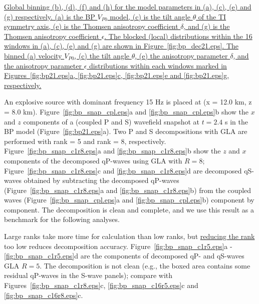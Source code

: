 \documentclass[manuscript,ulem,graphix,revised]{geophysics}
\begin{document}
 {
 \small{
 \uline{
Global binning (b), (d), (f) and (h) for the model parameters in (a), (c), (e) and (g) respectively.
 (a) is the BP $V_{P0}$ model, (c) is the tilt angle $\theta$ of the TI symmetry axis, (e) is the Thomsen anisotropy coefficient $\delta$, and (g) is the Thomsen anisotropy coefficient $\epsilon$. The blocked (local) distributions within the 16 windows in (a), (c), (e) and (g) are shown in Figure~\ref{fig:bp_dec21.eps}.
 }
}
}
 {
 \uline{
 The binned (a) velocity $V_{P0}$, (c) the tilt angle $\theta$, (e) the anisotropy parameter $\delta$, and the anisotropy parameter $\epsilon$ distributions within each windows marked in Figures~\ref{fig:bp21.eps}a, \ref{fig:bp21.eps}c, \ref{fig:bp21.eps}e and \ref{fig:bp21.eps}g, respectively.
}
}

An explosive source with dominant frequency 15 Hz is placed at (x = 12.0 km, z = 8.0 km). Figure~\ref{fig:bp_snap_cpl.eps}a and \ref{fig:bp_snap_cpl.eps}b show the $x$ and $z$ components of a (coupled P and S) wavefield snapshot at $t=2.4$ s in the BP model (Figure~\ref{fig:bp21.eps}a).
Two P and S decompositions with GLA are performed with rank = 5 and rank = 8, respectively.  
Figure~\ref{fig:bp_snap_c1r8.eps}a and \ref{fig:bp_snap_c1r8.eps}b show the  $z$ and $x$ components of the decomposed qP-waves using GLA with $R=8$; Figure~\ref{fig:bp_snap_c1r8.eps}c and \ref{fig:bp_snap_c1r8.eps}d are decomposed qS-waves obtained by subtracting the decomposed qP-waves (Figure~\ref{fig:bp_snap_c1r8.eps}a and \ref{fig:bp_snap_c1r8.eps}b) from the coupled waves (Figure~\ref{fig:bp_snap_cpl.eps}a and \ref{fig:bp_snap_cpl.eps}b) component by component. The decomposition is clean and complete, and we use this result as a benchmark for the following analyses. 

Large ranks take more time for calculation than low ranks, but \marginnote{[15]}\uline{reducing the rank} too low reduces decomposition accuracy. Figure~\ref{fig:bp_snap_c1r5.eps}a - \ref{fig:bp_snap_c1r5.eps}d are the components of decomposed qP- and qS-waves GLA $R=5$. The decomposition is not clean (e.g., the boxed area contains some residual qP-waves in the S-wave panels); compare with Figures~\ref{fig:bp_snap_c1r8.eps}c, \ref{fig:bp_snap_c16r5.eps}c and \ref{fig:bp_snap_c16r8.eps}c.
\end{document}
